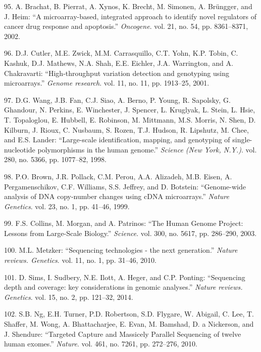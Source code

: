 \documentclass[12pt,twoside]{ugathesis}
\theoremstyle{definition}
\theoremstyle{definition}
\theoremstyle{remark}
\begin{document}
\hypertarget{ref-Brachat2002}{}
95. A. Brachat, B. Pierrat, A. Xynos, K. Brecht, M. Simonen, A.
Brüngger, and J. Heim: ``A microarray-based, integrated approach to
identify novel regulators of cancer drug response and apoptosis.''
\emph{Oncogene}. vol. 21, no. 54, pp. 8361--8371, 2002.

\hypertarget{ref-Cutler2001}{}
96. D.J. Cutler, M.E. Zwick, M.M. Carrasquillo, C.T. Yohn, K.P. Tobin,
C. Kashuk, D.J. Mathews, N.A. Shah, E.E. Eichler, J.A. Warrington, and
A. Chakravarti: ``High-throughput variation detection and genotyping
using microarrays.'' \emph{Genome research}. vol. 11, no. 11, pp.
1913--25, 2001.

\hypertarget{ref-Wang1998}{}
97. D.G. Wang, J.B. Fan, C.J. Siao, A. Berno, P. Young, R. Sapolsky, G.
Ghandour, N. Perkins, E. Winchester, J. Spencer, L. Kruglyak, L. Stein,
L. Hsie, T. Topaloglou, E. Hubbell, E. Robinson, M. Mittmann, M.S.
Morris, N. Shen, D. Kilburn, J. Rioux, C. Nusbaum, S. Rozen, T.J.
Hudson, R. Lipshutz, M. Chee, and E.S. Lander: ``Large-scale
identification, mapping, and genotyping of single-nucleotide
polymorphisms in the human genome.'' \emph{Science (New York, N.Y.)}.
vol. 280, no. 5366, pp. 1077--82, 1998.

\hypertarget{ref-Brown1999}{}
98. P.O. Brown, J.R. Pollack, C.M. Perou, A.A. Alizadeh, M.B. Eisen, A.
Pergamenschikov, C.F. Williams, S.S. Jeffrey, and D. Botstein:
``Genome-wide analysis of DNA copy-number changes using cDNA
microarrays.'' \emph{Nature Genetics}. vol. 23, no. 1, pp. 41--46, 1999.

\hypertarget{ref-Collins2003}{}
99. F.S. Collins, M. Morgan, and A. Patrinos: ``The Human Genome
Project: Lessons from Large-Scale Biology.'' \emph{Science}. vol. 300,
no. 5617, pp. 286--290, 2003.

\hypertarget{ref-Metzker2010}{}
100. M.L. Metzker: ``Sequencing technologies - the next generation.''
\emph{Nature reviews. Genetics}. vol. 11, no. 1, pp. 31--46, 2010.

\hypertarget{ref-Sims2014}{}
101. D. Sims, I. Sudbery, N.E. Ilott, A. Heger, and C.P. Ponting:
``Sequencing depth and coverage: key considerations in genomic
analyses.'' \emph{Nature reviews. Genetics}. vol. 15, no. 2, pp.
121--32, 2014.

\hypertarget{ref-Ng2010}{}
102. S.B. Ng, E.H. Turner, P.D. Robertson, S.D. Flygare, W. Abigail, C.
Lee, T. Shaffer, M. Wong, A. Bhattacharjee, E. Evan, M. Bamshad, D. a
Nickerson, and J. Shendure: ``Targeted Capture and Massicely Parallel
Sequencing of twelve human exomes.'' \emph{Nature}. vol. 461, no. 7261,
pp. 272--276, 2010.
\end{document}
